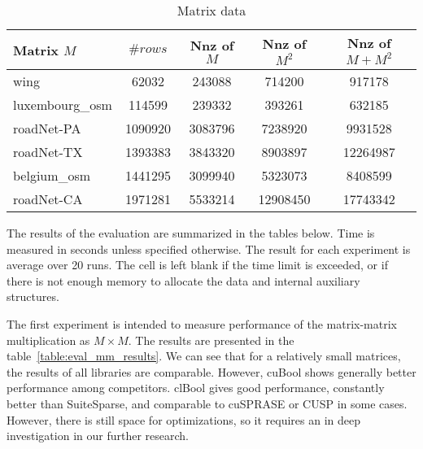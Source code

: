{\setlength{\tabcolsep}{0.3em}
\begin{table}
\centering
{
\caption{Matrix data}
\label{table:sparse_matrices}
\scriptsize
{}
\begin{tabular}{|l|c|c|c|c|}
\hline
Matrix $M$      & $\# rows$  & Nnz of $M$   & Nnz of $M^2$  & Nnz of $M + M^2$ \\
\hline
\hline
wing            & 62032      & 243088       & 714200        & 917178            \\
luxembourg\_osm & 114599     & 239332       & 393261        & 632185            \\
roadNet-PA      & 1090920    & 3083796      & 7238920       & 9931528           \\
roadNet-TX      & 1393383    & 3843320      & 8903897       & 12264987          \\
belgium\_osm    & 1441295    & 3099940      & 5323073       & 8408599           \\
roadNet-CA      & 1971281    & 5533214      & 12908450      & 17743342          \\

\hline
\end{tabular}
}
\end{table}
}

The results of the evaluation are summarized in the tables below.
Time is measured in seconds unless specified otherwise.
The result for each experiment is average over 20 runs. 
The cell is left blank if the time limit is exceeded, 
or if there is not enough memory to allocate the data and internal auxiliary structures.  

The first experiment is intended to measure performance of the matrix-matrix multiplication as $M \times M$. 
The results are presented in the table~\ref{table:eval_mm_results}. 
We can see that for a relatively small matrices, the results of all libraries are comparable. 
However, cuBool shows generally better performance among competitors.
clBool gives good performance, constantly better than SuiteSparse, and comparable to cuSPRASE or CUSP in some cases.
However, there is still space for optimizations, so it requires an in deep investigation in our further research.

